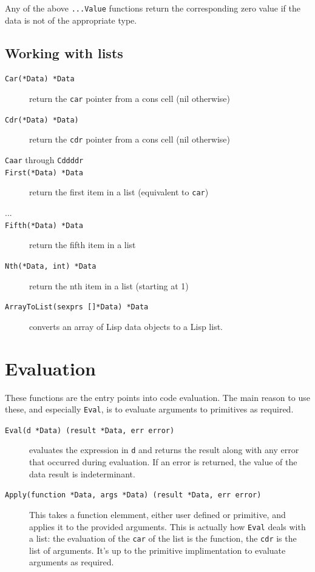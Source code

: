 \documentclass[12pt]{article}
\begin{document}
\noindent Any of the above \verb|...Value| functions return the
corresponding zero value if the data is 
not of the appropriate type.

\subsection{Working with lists}

\begin{description}
\item [{\tt Car(*Data) *Data}] return the \verb|car| pointer from a cons
  cell (nil otherwise)
\item [{\tt Cdr(*Data) *Data)}] return the \verb|cdr| pointer from a cons
  cell (nil otherwise)
\item [{\tt Caar} through {\tt Cddddr}]
\item [{\tt First(*Data) *Data}] return the first item in a list
  (equivalent to \verb|car|)
\item [...]
\item [{\tt Fifth(*Data) *Data}] return the fifth item in a list
\item [{\tt Nth(*Data, int) *Data}] return the nth item in a list
  (starting at 1)
\item [{\tt ArrayToList(sexprs []*Data) *Data}] converts an array of
  Lisp data objects to a Lisp list.
\end{description}

\section{Evaluation}

These functions are the entry points into code evaluation. The main
reason to use these, and especially \verb|Eval|, is to evaluate
arguments to primitives as required.

\begin{description}
\item [{\tt Eval(d *Data) (result *Data, err error)}] evaluates the
  expression in \verb|d| and returns the result along with any error
  that occurred during evaluation. If an error is returned, the value
  of the data result is indeterminant.
\item [{\tt Apply(function *Data, args *Data) (result *Data, err error)}]
  This takes a function elemment, either user defined or
  primitive, and applies it to the provided arguments. This is actually
  how \verb|Eval| deals with a list: the evaluation of the \verb|car| of the list is the
  function, the \verb|cdr| is the list of arguments. It's up to the
  primitive implimentation to evaluate arguments as required.
\end{description}
\end{document}
